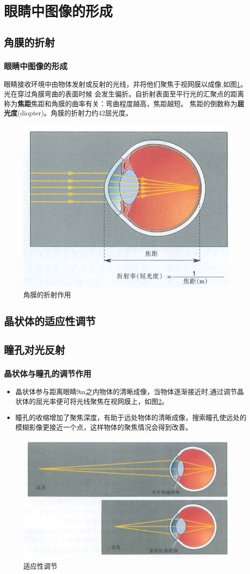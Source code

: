 \section{眼睛中图像的形成}
\subsection{角膜的折射}
\begin{frame}
    \frametitle{眼睛中图像的形成}

    眼睛接收环境中由物体发射或反射的光线，并将他们聚焦于视网膜以成像,如图\ref{pic3-1}。光在穿过角膜弯曲的表面时候
    会发生偏折。自折射表面至平行光的汇聚点的距离称为\textbf{焦距}焦距和角膜的曲率有关：弯曲程度越高，焦距越短。
    焦距的倒数称为\textbf{屈光度}(diopter)。角膜的折射力约42屈光度。
    \begin{figure}
        \centering
        \includegraphics[height=0.3\textwidth]{img/pic3-1.png}
        \caption{角膜的折射作用\label{pic3-1}}
    \end{figure}

\end{frame}
\subsection{晶状体的适应性调节}
\subsection{瞳孔对光反射}

\begin{frame}
    \frametitle{晶状体与瞳孔的调节作用}
    \begin{itemize}
        \item 晶状体参与距离眼睛9m之内物体的清晰成像，当物体逐渐接近时,通过调节晶状体的屈光率便可将光线聚焦在视网膜上，如图\ref{pic3-2}。
        \item 瞳孔的收缩增加了聚焦深度，有助于远处物体的清晰成像，搜索瞳孔使远处的模糊影像更接近一个点，这样物体的聚焦情况会得到改善。
    \end{itemize}
    \begin{figure}
        \centering
        \includegraphics[height=0.3\textwidth]{img/pic3-2.png}
        \caption{适应性调节\label{pic3-2}}
    \end{figure}
\end{frame}

